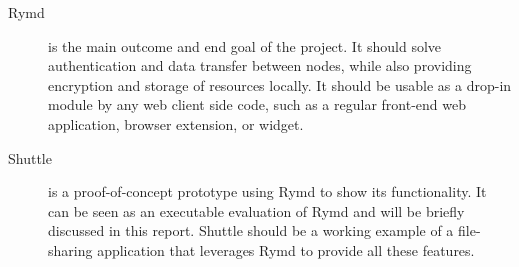 \begin{description}
\item[Rymd] is the main outcome and end goal of the project. It should solve authentication and data transfer between nodes, while also providing encryption and storage of resources locally. It should be usable as a drop-in module by any web client side code, such as a regular front-end web application, browser extension, or widget.
\item[Shuttle] is a proof-of-concept prototype using Rymd to show its functionality. It can be seen as an executable evaluation of Rymd and will be briefly discussed in this report. Shuttle should be a working example of a file-sharing application that leverages Rymd to provide all these features.
\end{description}


